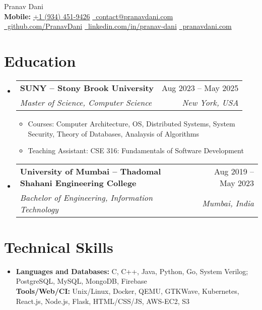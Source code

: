 \documentclass[letterpaper,11pt]{article}
\makeatletter
\newcommand{\resumeItem}[1]{
  \item\small{
    {#1 \vspace{-2pt}}
  }
}
\newcommand{\resumeSubheading}[4]{
  \vspace{-2pt}\item
    \begin{tabular*}{1.0\textwidth}[t]{l@{\extracolsep{\fill}}r}
      \vspace{-2pt}\textbf{#1} & \small #2 \\
      \textit{\small#3} & \textit{\small #4} \\
    \end{tabular*}\vspace{-7pt}
}
\newcommand{\resumeSubHeadingListStart}{\begin{itemize}[leftmargin=0.0in, label={}]}
\newcommand{\resumeSubHeadingListEnd}{\end{itemize}}
\newcommand{\resumeItemListStart}{\begin{itemize}}
\newcommand{\resumeItemListEnd}{\end{itemize}\vspace{-5pt}}
\makeatother
\begin{document}

\begin{center}
  {\huge Pranav Dani} \\[4pt]
  \small
  \textbf{Mobile:} \href{tel:+19344529426}{+1 (934) 451-9426}
  \quad   \faEnvelope \href{mailto:contact@pranavdani.com}{\raisebox{-0.2\height}\    contact@pranavdani.com}\\
  \faGithub \href{https://github.com/PranavDani}{\raisebox{-0.2\height}\  github.com/PranavDani} \quad
  \faLinkedin \href{https://linkedin.com/in/pranav-dani}{\raisebox{-0.2\height}\  linkedin.com/in/pranav-dani} \quad
  \faGlobe \href{https://pranavdani.com}{\raisebox{-0.1\height}\ pranavdani.com}
  \vspace{-10pt}
\end{center}


\section{Education}
\resumeSubHeadingListStart
\resumeSubheading
{SUNY -- Stony Brook University}{Aug 2023 -- May 2025}
{Master of Science, Computer Science}{New York, USA}
\resumeItemListStart
\resumeItem{Courses: Computer Architecture, OS, Distributed Systems, System Security, Theory of Databases, Analaysis of Algorithms}
\vspace{-2pt}
\resumeItem{Teaching Assistant: CSE 316: Fundamentals of Software Development}
\resumeItemListEnd
\vspace{-3pt}

\resumeSubheading
{University of Mumbai -- Thadomal Shahani Engineering College}{Aug 2019 -- May 2023}
{Bachelor of Engineering, Information Technology}{Mumbai, India}
\resumeSubHeadingListEnd


\section{Technical Skills}
\begin{itemize}[leftmargin=0.2in, label={}]
  \item \textbf{Languages and Databases:} C, C++, Java, Python, Go, System Verilog; PostgreSQL, MySQL, MongoDB, Firebase\\
        \textbf{Tools/Web/CI:} Unix/Linux, Docker, QEMU, GTKWave, Kubernetes,  React.js, Node.js, Flask, HTML/CSS/JS, AWS-EC2, S3
\end{itemize}
\vspace{-16pt}
\end{document}
